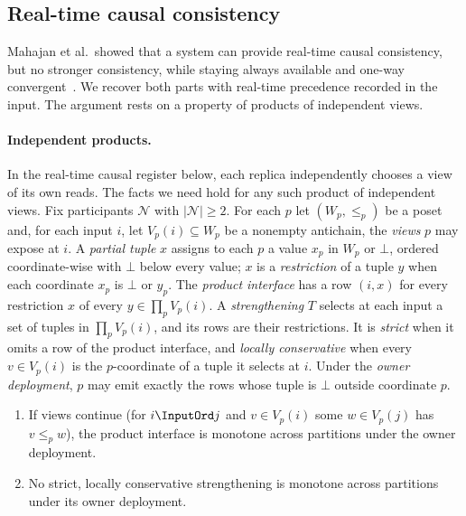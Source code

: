 \subsection{Real-time causal consistency}
\label{app:rtc}

Mahajan et al.\ showed that a system can provide real-time causal consistency,
but no stronger consistency, while staying always available and one-way
convergent~\cite{mahajan2011consistency}.  We recover both parts with real-time
precedence recorded in the input.  The argument rests on a property of
products of independent views.

\paragraph{Independent products.}
In the real-time causal register below, each replica independently chooses
a view of its own reads.  The facts we need hold for any such product of
independent views.  Fix participants
$\mathcal N$ with $|\mathcal N|\ge2$.  For each $p$ let $(W_p,\le_p)$ be a poset
and, for each input $i$, let $V_p(i)\subseteq W_p$ be a nonempty antichain, the
\emph{views} $p$ may expose at $i$.  A \emph{partial tuple} $x$ assigns to each
$p$ a value $x_p$ in $W_p$ or $\bot$, ordered coordinate-wise with $\bot$ below
every value; $x$ is a \emph{restriction} of a tuple $y$ when each coordinate
$x_p$ is $\bot$ or $y_p$.  The \emph{product interface} has a row
$(i,x)$ for every restriction $x$ of every $y\in\prod_pV_p(i)$.  A
\emph{strengthening} $T$ selects at each input a set of tuples in
$\prod_pV_p(i)$, and its rows are their restrictions.  It is \emph{strict} when
it omits a row of the product interface, and \emph{locally conservative} when
every $v\in V_p(i)$ is the $p$-coordinate of a tuple it selects at $i$.  Under
the \emph{owner deployment}, $p$ may emit exactly the rows whose tuple is
$\bot$ outside coordinate $p$.

\begin{theorem}
\label{thm:product-frontier}
\leavevmode
\begin{enumerate}
  \item If views continue (for $i\InputOrd j$ and $v\in V_p(i)$ some $w\in
        V_p(j)$ has $v\le_p w$), the product interface is monotone across
        partitions under the owner deployment.
  \item No strict, locally conservative strengthening is monotone across
        partitions under its owner deployment.
\end{enumerate}
\end{theorem}


